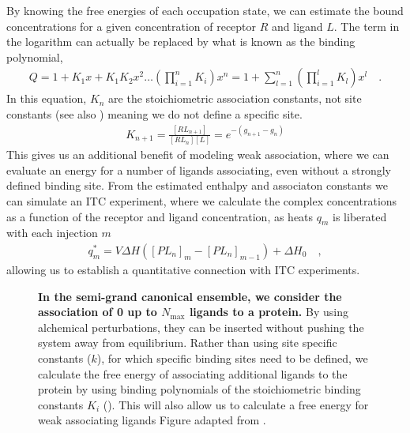\documentclass[10pt,final]{article}
\begin{document}
By knowing the free energies of each occupation state, we can estimate the bound concentrations for a given concentration of receptor $R$ and ligand $L$.
%
The term in the logarithm can actually be replaced by what is known as the binding polynomial, 
%
\begin{align}
 Q = 1 + K_1x + K_1K_2x^2 \dots \left(\prod\limits_{i=1}^{n} K_i\right) x^n = 1 + \sum\limits_{l=1}^n \left(\prod\limits_{i=1}^{l} K_l\right)x^l \quad.
 \label{equation:bindingpolynomial}
\end{align}
In this equation, $K_n$ are the stoichiometric association constants, not site constants (see also ) meaning we do not define a specific site.
%
\begin{align}
K_{n+1} = \frac{[RL_{n+1}]}{[RL_n][L]} = e^{-(g_{n+1}-g_n)}
\label{eq:K_eq}
\end{align}
%
This gives us an additional benefit of modeling weak association, where we can evaluate an energy for a number of ligands associating, even without a strongly defined binding site. 
%
From the estimated enthalpy and associaton constants we can simulate an ITC experiment, where we calculate the complex concentrations as a function of the receptor and ligand concentration, as heats $q_m$ is liberated with each injection $m$
%
\begin{align}
 q_m^* = V \Delta H \left( [PL_n]_m - [PL_n]_{m-1} \right) + \Delta H_0 \quad, \label{equation:liberated-heat}
\end{align}
%
allowing us to establish a quantitative connection with ITC experiments.

\begin{figure}[H]
  \centering
  \caption{\textbf{In the semi-grand canonical ensemble, we consider the association of 0 up to $N_\mathrm{max}$ ligands to a protein.} By using alchemical perturbations, they can be inserted without pushing the system away from equilibrium. Rather than using site specific constants ($k$), for which specific binding sites need to be defined, we calculate the free energy of associating additional ligands to the protein by using binding polynomials of the stoichiometric binding constants $K_i$ (). This will also allow us to calculate a free energy for weak associating ligands Figure adapted from \textcite{Klotz1997a}. }
  \label{figure:semi-grand}
\end{figure}
\end{document}
